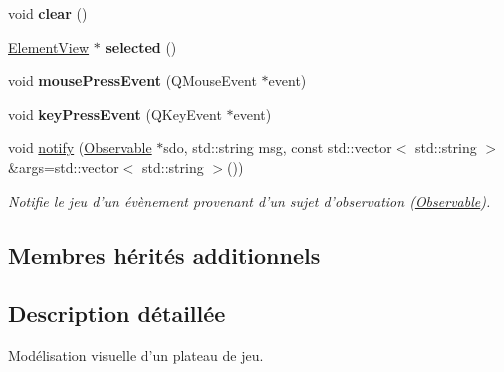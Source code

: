 \begin{DoxyCompactItemize}
\item 
\hypertarget{classMapView_a1c41de9351ee9f91008be7a201a3a99c}{void {\bfseries clear} ()}\label{classMapView_a1c41de9351ee9f91008be7a201a3a99c}

\item 
\hypertarget{classMapView_ab1af933413ea299a5f6d735561623471}{\hyperlink{classElementView}{Element\+View} $\ast$ {\bfseries selected} ()}\label{classMapView_ab1af933413ea299a5f6d735561623471}

\item 
\hypertarget{classMapView_aba384cd40d1f62de22ca5b3af9218656}{void {\bfseries mouse\+Press\+Event} (Q\+Mouse\+Event $\ast$event)}\label{classMapView_aba384cd40d1f62de22ca5b3af9218656}

\item 
\hypertarget{classMapView_aab858f1281826a9b9b992ecd1809127a}{void {\bfseries key\+Press\+Event} (Q\+Key\+Event $\ast$event)}\label{classMapView_aab858f1281826a9b9b992ecd1809127a}

\item 
void \hyperlink{classMapView_ac350f8c6a05f696934268a3584b53a44}{notify} (\hyperlink{classObservable}{Observable} $\ast$sdo, std\+::string msg, const std\+::vector$<$ std\+::string $>$ \&args=std\+::vector$<$ std\+::string $>$())
\begin{DoxyCompactList}\small\item\em Notifie le jeu d'un évènement provenant d'un sujet d'observation (\hyperlink{classObservable}{Observable}). \end{DoxyCompactList}\end{DoxyCompactItemize}
\subsection*{Membres hérités additionnels}


\subsection{Description détaillée}
Modélisation visuelle d’un plateau de jeu. 

